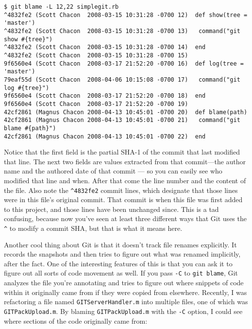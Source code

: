 \documentclass[a4paper]{book}
\begin{document}
\begin{shaded}\begin{verbatim}
$ git blame -L 12,22 simplegit.rb
^4832fe2 (Scott Chacon  2008-03-15 10:31:28 -0700 12)  def show(tree = 'master')
^4832fe2 (Scott Chacon  2008-03-15 10:31:28 -0700 13)   command("git show #{tree}")
^4832fe2 (Scott Chacon  2008-03-15 10:31:28 -0700 14)  end
^4832fe2 (Scott Chacon  2008-03-15 10:31:28 -0700 15)
9f6560e4 (Scott Chacon  2008-03-17 21:52:20 -0700 16)  def log(tree = 'master')
79eaf55d (Scott Chacon  2008-04-06 10:15:08 -0700 17)   command("git log #{tree}")
9f6560e4 (Scott Chacon  2008-03-17 21:52:20 -0700 18)  end
9f6560e4 (Scott Chacon  2008-03-17 21:52:20 -0700 19)
42cf2861 (Magnus Chacon 2008-04-13 10:45:01 -0700 20)  def blame(path)
42cf2861 (Magnus Chacon 2008-04-13 10:45:01 -0700 21)   command("git blame #{path}")
42cf2861 (Magnus Chacon 2008-04-13 10:45:01 -0700 22)  end
\end{verbatim}\end{shaded}

Notice that the first field is the partial SHA-1 of the commit that last modified that line. The next two fields are values extracted from that commit---the author name and the authored date of that commit --- so you can easily see who modified that line and when. After that come the line number and the content of the file. Also note the \texttt{\^{}4832fe2} commit lines, which designate that those lines were in this file's original commit. That commit is when this file was first added to this project, and those lines have been unchanged since. This is a tad confusing, because now you've seen at least three different ways that Git uses the \texttt{\^{}} to modify a commit SHA, but that is what it means here.

Another cool thing about Git is that it doesn't track file renames explicitly. It records the snapshots and then tries to figure out what was renamed implicitly, after the fact. One of the interesting features of this is that you can ask it to figure out all sorts of code movement as well. If you pass \texttt{-C} to \texttt{git blame}, Git analyzes the file you're annotating and tries to figure out where snippets of code within it originally came from if they were copied from elsewhere. Recently, I was refactoring a file named \texttt{GITServerHandler.m} into multiple files, one of which was \texttt{GITPackUpload.m}. By blaming \texttt{GITPackUpload.m} with the \texttt{-C} option, I could see where sections of the code originally came from:
\end{document}

